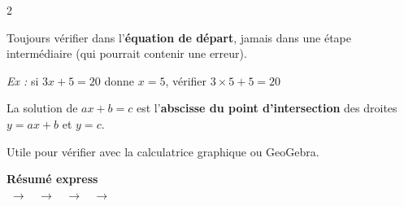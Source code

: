 \documentclass[a4paper,10pt]{article}
\begin{document}
\vspace{2pt}

\begin{multicols}{2}

\begin{astucebox}
Toujours vérifier dans l'\textbf{équation de départ}, jamais dans une étape intermédiaire (qui pourrait contenir une erreur).

\smallskip
{\small\textit{Ex :} si $3x + 5 = 20$ donne $x = 5$, vérifier $3 \times 5 + 5 = 20$~\checkmark}
\end{astucebox}

\columnbreak

\begin{astucebox}
La solution de $ax + b = c$ est l'\textbf{abscisse du point d'intersection} des droites $y = ax + b$ et $y = c$.

\smallskip
{\small Utile pour vérifier avec la calculatrice graphique ou GeoGebra.}
\end{astucebox}

\end{multicols}

\vspace{4pt}

\begin{resumebox}
\centering
\textbf{Résumé express}\\[4pt]
$\;\longrightarrow\;$
$\;\longrightarrow\;$
$\;\longrightarrow\;$
$\;\longrightarrow\;$
\end{resumebox}
\end{document}
